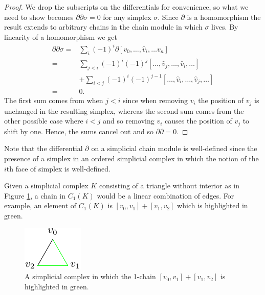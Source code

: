 \begin{proof}
  We drop the subscripts on the differentials for convenience, so what we need to show becomes $\partial \partial \sigma = 0 $ for any simplex $\sigma$. Since $\partial$ is a homomorphism the result extends to arbitrary chains in the chain module in which $\sigma$ lives. By linearity of a homomorphism we get
  \begin{align*}
    \partial \partial \sigma =& \sum_{i} (-1)^{i} \partial [v_{0}, \dots, \hat v_{i}, \dots v_{n}] \\
    =& \sum_{j < i} (-1)^{i} (-1)^{j} [ \dots,  \hat v_{j}, \dots , \hat v_{i}, \dots ] \\ &+ \sum_{i < j} (-1)^{i} (-1)^{j-1}  [ \dots,  \hat v_{i}, \dots , \hat v_{j}, \dots ] \\
    =& 0.
  \end{align*}
  The first sum comes from when $j<i$ since when removing $v_{i}$ the position of $v_{j}$ is unchanged in the resulting simplex, whereas the second sum comes from the other possible case where $i<j$ and so removing $v_{i}$ causes the position of $v_{j}$ to shift by one. Hence, the sums cancel out and so $\partial \partial = 0$. \end{proof}
Note that the differential $\partial$ on a simplicial chain module is well-defined since the presence of a simplex in an ordered simplicial complex in which the notion of the $i$th face of simplex is well-defined.
\begin{example}
Given a simplicial complex $K$ consisting of a triangle without interior as in Figure \ref{trichain}, a chain in $C_{1}(K)$ would be a linear combination of edges. For example, an element of $C_{1}(K)$ is $[v_{0},v_{1}]+[v_{1},v_{2}]$ which is highlighted in green.
\begin{figure}[ht]
  \centering
  \includegraphics[scale=2]{trichain.pdf}
  \caption{\label{trichain} A simplicial complex in which the 1-chain $[v_{0},v_{1}]+[v_{1},v_{2}]$ is highlighted in green.}
\end{figure}
\end{example}

